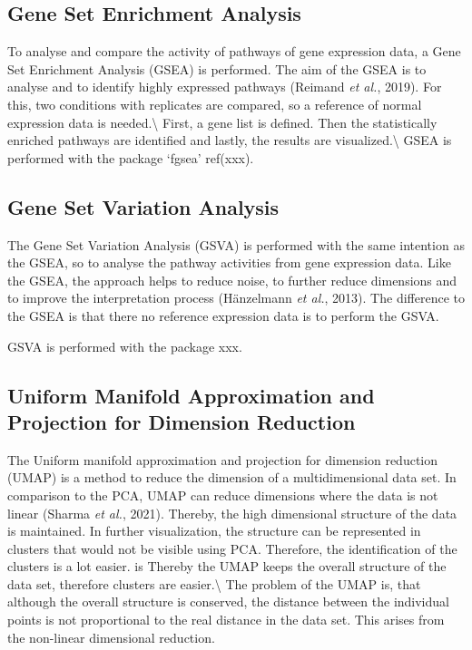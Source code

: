 \documentclass[
  parskip,
  oneside]{scrreprt}
\begin{document}
\hypertarget{gene-set-enrichment-analysis}{%
\subsection{Gene Set Enrichment
Analysis}\label{gene-set-enrichment-analysis}}

To analyse and compare the activity of pathways of gene expression data,
a Gene Set Enrichment Analysis (GSEA) is performed. The aim of the GSEA
is to analyse and to identify highly expressed pathways (Reimand
\emph{et al.}, 2019). For this, two conditions with replicates are
compared, so a reference of normal expression data is
needed.\textbackslash{} First, a gene list is defined. Then the
statistically enriched pathways are identified and lastly, the results
are visualized.\textbackslash{} GSEA is performed with the package
`fgsea' ref(xxx).

\hypertarget{gene-set-variation-analysis}{%
\subsection{Gene Set Variation
Analysis}\label{gene-set-variation-analysis}}

The Gene Set Variation Analysis (GSVA) is performed with the same
intention as the GSEA, so to analyse the pathway activities from gene
expression data. Like the GSEA, the approach helps to reduce noise, to
further reduce dimensions and to improve the interpretation process
(Hänzelmann \emph{et al.}, 2013). The difference to the GSEA is that
there no reference expression data is to perform the GSVA.

GSVA is performed with the package xxx.

\hypertarget{uniform-manifold-approximation-and-projection-for-dimension-reduction}{%
\subsection{Uniform Manifold Approximation and Projection for Dimension
Reduction}\label{uniform-manifold-approximation-and-projection-for-dimension-reduction}}

The Uniform manifold approximation and projection for dimension
reduction (UMAP) is a method to reduce the dimension of a
multidimensional data set. In comparison to the PCA, UMAP can reduce
dimensions where the data is not linear (Sharma \emph{et al.}, 2021).
Thereby, the high dimensional structure of the data is maintained. In
further visualization, the structure can be represented in clusters that
would not be visible using PCA. Therefore, the identification of the
clusters is a lot easier. is Thereby the UMAP keeps the overall
structure of the data set, therefore clusters are
easier.\textbackslash{} The problem of the UMAP is, that although the
overall structure is conserved, the distance between the individual
points is not proportional to the real distance in the data set. This
arises from the non-linear dimensional reduction.
\end{document}
